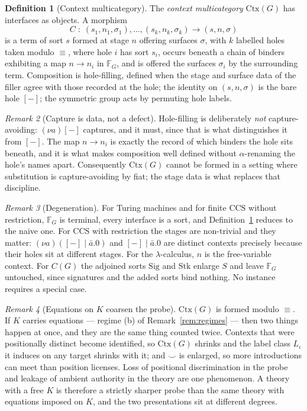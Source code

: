 \documentclass[11pt,a4paper]{article}
\theoremstyle{definition}
\newtheorem{definition}{Definition}[section]
\theoremstyle{plain}
\theoremstyle{remark}
\newtheorem{remark}[definition]{Remark}
\newcommand{\Ctx}{\mathrm{Ctx}}
\newcommand{\hole}{[-]}
\begin{document}
\begin{definition}[Context multicategory]
\label{def:ctx}
The \emph{context multicategory} $\Ctx(G)$ has interfaces as objects. A morphism
\[
C \;:\; (s_1,n_1,\sigma_1),\dots,(s_k,n_k,\sigma_k) \longrightarrow (s,n,\sigma)
\]
is a term of sort $s$ formed at stage $n$ offering surfaces $\sigma$, with $k$
labelled holes taken modulo $\equiv$, where hole $i$ has sort $s_i$, occurs beneath a
chain of binders exhibiting a map $n \to n_i$ in $\mathbb{F}_G$, and is offered the
surfaces $\sigma_i$ by the surrounding term. Composition is hole-filling, defined
when the stage and surface data of the filler agree with those recorded at the hole;
the identity on $(s,n,\sigma)$ is the bare hole $\hole$; the symmetric group acts by
permuting hole labels.
\end{definition}

\begin{remark}[Capture is data, not a defect]
\label{rem:capture}
Hole-filling is deliberately \emph{not} capture-avoiding: $(\nu a)\hole$ captures,
and it must, since that is what distinguishes it from $\hole$. The map $n \to n_i$
is exactly the record of which binders the hole sits beneath, and it is what makes
composition well defined without $\alpha$-renaming the hole's names apart.
Consequently $\Ctx(G)$ cannot be formed in a setting where substitution is
capture-avoiding by fiat; the stage data is what replaces that discipline.
\end{remark}

\begin{remark}[Degeneration]
\label{rem:degenerate}
For Turing machines and for finite CCS without restriction, $\mathbb{F}_G$ is
terminal, every interface is a sort, and Definition~\ref{def:ctx} reduces to the
naive one. For CCS with restriction the stages are non-trivial and they matter:
$(\nu a)(\hole \mid \bar a.0)$ and $\hole \mid \bar a.0$ are distinct contexts
precisely because their holes sit at different stages. For the $\lambda$-calculus,
$n$ is the free-variable context. For $C(G)$ the adjoined sorts $\mathrm{Sig}$ and
$\mathrm{Stk}$ enlarge $S$ and leave $\mathbb{F}_G$ untouched, since signatures and
the added sorts bind nothing. No instance requires a special case.
\end{remark}

\begin{remark}[Equations on $K$ coarsen the probe]
\label{rem:Kequations}
$\Ctx(G)$ is formed modulo $\equiv$. If $K$ carries equations --- regime (b) of
Remark~\ref{rem:regimes} --- then two things happen at once, and they are the same
thing counted twice. Contexts that were positionally distinct become identified, so
$\Ctx(G)$ shrinks and the label class $L_\iota$ it induces on any target shrinks with
it; and $\smile$ is enlarged, so more introductions can meet than position licenses.
Loss of positional discrimination in the probe and leakage of ambient authority in
the theory are one phenomenon. A theory with a free $K$ is therefore a strictly
sharper probe than the same theory with equations imposed on $K$, and the two
presentations sit at different degrees.
\end{remark}
\end{document}
